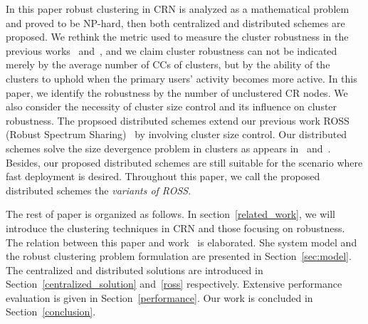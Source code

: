 \documentclass[times]{ettauth}
\theoremstyle{mytheoremstyle}
\theoremstyle{mytheoremstyle}
\theoremstyle{mytheoremstyle}
\begin{document}
In this paper robust clustering in CRN is analyzed as a mathematical problem and proved to be NP-hard, then both centralized and distributed schemes are proposed.
We rethink the metric used to measure the cluster robustness in the previous works~\cite{Li11_ROSS} and~\cite{LIU_TMC11_2}, and we claim cluster robustness can not be indicated merely by the average number of CCs of clusters, but by the ability of the clusters to uphold when the primary users' activity becomes more active.
In this paper, we identify the robustness by the number of unclustered CR nodes.
We also consider the necessity of cluster size control and its influence on cluster robustness.
The propsoed distributed schemes extend our previous work ROSS (Robust Spectrum Sharing)~\cite{Li11_ROSS} by involving cluster size control.
Our distributed schemes solve the size devergence problem in clusters as appears in~\cite{Li11_ROSS} and~\cite{LIU_TMC11_2}.
Besides, our proposed distributed schemes are still suitable for the scenario where fast deployment is desired.
Throughout this paper, we call the proposed distributed schemes the \textit{variants of ROSS}.
 
%
%
The rest of paper is organized as follows. 
In section~\ref{related_work}, we will introduce the clustering techniques in CRN and those focusing on robustness.
The relation between this paper and work~\cite{Li11_ROSS} is elaborated.
She system model and the robust clustering problem formulation are presented in Section~\ref{sec:model}. 
The centralized and distributed solutions are introduced in Section~\ref{centralized_solution} and~\ref{ross} respectively.
Extensive performance evaluation is given in Section~\ref{performance}.
Our work is concluded in Section~\ref{conclusion}.
\end{document}
